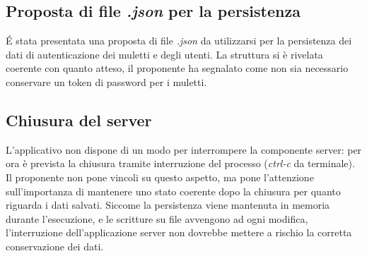 \subsection{Proposta di file \textit{.json} per la persistenza}

\'E stata presentata una proposta di file \textit{.json} da utilizzarsi per la persistenza dei dati di autenticazione dei muletti e degli utenti. La struttura si è rivelata coerente con quanto atteso, il proponente ha segnalato come non sia necessario conservare un token di password per i muletti.

\subsection{Chiusura del server}

L'applicativo non dispone di un modo per interrompere la componente server: per ora è prevista la chiusura tramite interruzione del processo (\textit{ctrl-c} da terminale). Il proponente non pone vincoli su questo aspetto, ma pone l'attenzione sull'importanza di mantenere uno stato coerente dopo la chiusura per quanto riguarda i dati salvati. Siccome la persistenza viene mantenuta in memoria durante l'esecuzione, e le scritture su file avvengono ad ogni modifica, l'interruzione dell'applicazione server non dovrebbe mettere a rischio la corretta conservazione dei dati.


